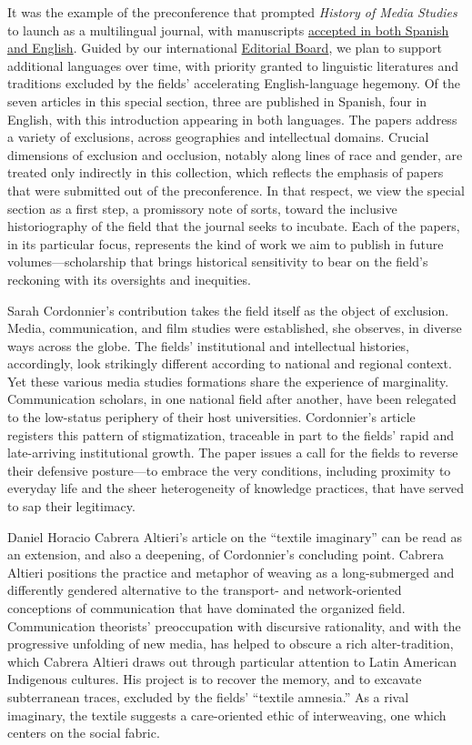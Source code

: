 \documentclass{tufte-handout}
\begin{document}
It was the example of the preconference that prompted \emph{History of
Media Studies} to launch as a multilingual journal, with manuscripts
\href{https://hms.mediastudies.press/author-guidelines}{accepted in both
Spanish and English}. Guided by our international
\href{https://hms.mediastudies.press/editorial}{Editorial Board}, we
plan to support additional languages over time, with priority granted to
linguistic literatures and traditions excluded by the fields'
accelerating English-language hegemony. Of the seven articles in this
special section, three are published in Spanish, four in English, with
this introduction appearing in both languages. The papers address a
variety of exclusions, across geographies and intellectual domains.
Crucial dimensions of exclusion and occlusion, notably along lines of
race and gender, are treated only indirectly in this collection, which
reflects the emphasis of papers that were submitted out of the
preconference. In that respect, we view the special section as a first
step, a promissory note of sorts, toward the inclusive historiography of
the field that the journal seeks to incubate. Each of the papers, in its
particular focus, represents the kind of work we aim to publish in
future volumes---scholarship that brings historical sensitivity to bear
on the field's reckoning with its oversights and inequities.

Sarah Cordonnier's contribution takes the field itself as the object of
exclusion. Media, communication, and film studies were established, she
observes, in diverse ways across the globe. The fields' institutional
and intellectual histories, accordingly, look strikingly different
according to national and regional context. Yet these various media
studies formations share the experience of marginality. Communication
scholars, in one national field after another, have been relegated to
the low-status periphery of their host universities. Cordonnier's
article registers this pattern of stigmatization, traceable in part to
the fields' rapid and late-arriving institutional growth. The paper
issues a call for the fields to reverse their defensive posture---to
embrace the very conditions, including proximity to everyday life and
the sheer heterogeneity of knowledge practices, that have served to sap
their legitimacy.

Daniel Horacio Cabrera Altieri's article on the ``textile imaginary''
can be read as an extension, and also a deepening, of Cordonnier's
concluding point. Cabrera Altieri positions the practice and metaphor of
weaving as a long-submerged and differently gendered alternative to the
transport- and network-oriented conceptions of communication that have
dominated the organized field. Communication theorists' preoccupation
with discursive rationality, and with the progressive unfolding of new
media, has helped to obscure a rich alter-tradition, which Cabrera
Altieri draws out through particular attention to Latin American
Indigenous cultures. His project is to recover the memory, and to
excavate subterranean traces, excluded by the fields' ``textile
amnesia.'' As a rival imaginary, the textile suggests a care-oriented
ethic of interweaving, one which centers on the social fabric.
\end{document}
